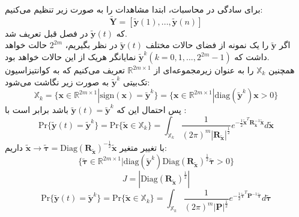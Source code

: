 برای سادگی در محاسبات، ابتدا مشاهدات را به صورت زیر تنظیم می‌کنیم:
\begin{equation}
	\tilde{\mathbf{Y}}=[\tilde{\mathbf{y}}(1), ..., \tilde{\mathbf{y}}(n)]
\end{equation}
که 
$\tilde{\mathbf{y}}(t)$
در فصل قبل تعریف شد. \\
اگر 
$\tilde{\mathbf{y}}$
را یک نمونه از فضای حالات مختلف 
$\tilde{\mathbf{y}}(t)$
در نظر بگیریم، 
$2^{2m}$
حالت خواهد داشت که \linebreak
$\tilde{\mathbf{y}}^k(k=0, 1, ..., 2^{2m}-1)$
نمایانگر هریک از این حالات خواهد بود. \\
همچنین
$\mathbb{X}_k$
را به عنوان زیرمجموعه‌ای از 
$\mathbb{R}^{2m\times1}$
تعریف می‌کنیم که به کوانتیزاسیون تک‌بیتی 
$\tilde{\mathbf{y}}^k$
به صورت زیر نگاشت می‌شود:
\begin{equation}
	\mathbb{X}_k=\{\mathbf{x}\in\mathbb{R}^{2m\times1}|\mathrm{sign}(\mathbf{x})=\tilde{\mathbf{y}}^k\}=\{\mathbf{x}\in\mathbb{R}^{2m\times1}|\mathrm{diag}(\tilde{\mathbf{y}}^k)\mathbf{x}>0\}
\end{equation}
پس احتمال این که 
$\tilde{\mathbf{y}}(t)=\tilde{\mathbf{y}}^k$
باشد برابر است با :
\begin{equation}
	\mathrm{Pr}\{\tilde{\mathbf{y}}(t)=\tilde{\mathbf{y}}^k\}=\mathrm{Pr}\{\tilde{\mathbf{x}}\in\mathbb{X}_k\}=\int_{\mathbb{X}_k} \frac{1}{\left(2\pi\right)^m\left|\mathbf{R}_{\tilde{\mathbf{x}}}\right|^{\frac{1}{2}}}e^{-\frac{1}{2}\tilde{\mathbf{x}}^T\mathbf{R}_{\tilde{\mathbf{x}}}^{-1}\tilde{\mathbf{x}}} d\tilde{\mathbf{x}}
	\label{eq:1}
\end{equation}
با تغییر متغیر
$\tilde{\mathbf{x}}\rightarrow\tilde{\mathbf{\tau}}=\mathrm{Diag}\left(\mathbf{R}_{\tilde{\mathbf{x}}}\right)^{-\frac{1}{2}}\tilde{\mathbf{x}}$
داریم:
\begin{equation}
	\{\tilde{\mathbf{\tau}}\in\mathbb{R}^{2m\times1}|\mathrm{diag}(\tilde{\mathbf{y}}^k)\mathrm{Diag}\left(\mathbf{R}_{\tilde{\mathbf{x}}}\right)^{\frac{1}{2}}\tilde{\boldsymbol{\tau}}>0\}
\end{equation}
$$J=\left|\mathrm{Diag}(\mathbf{R}_{\tilde{\mathbf{x}}})^{\frac{1}{2}}\right|$$
\begin{equation}
	\mathrm{Pr}\{\tilde{\mathbf{y}}(t)=\tilde{\mathbf{y}}^k\}=\mathrm{Pr}\{\tilde{\mathbf{x}}\in\mathbb{X}_k\}=\int_{\mathbb{X}_k} \frac{1}{\left(2\pi\right)^m\left|\mathbf{P}\right|^{\frac{1}{2}}}e^{-\frac{1}{2}\tilde{\boldsymbol{\tau}}^T\mathbf{P}^{-1}\tilde{\boldsymbol{\tau}}} d\tilde{\boldsymbol{\tau}}
	\label{eq:2}
\end{equation}
